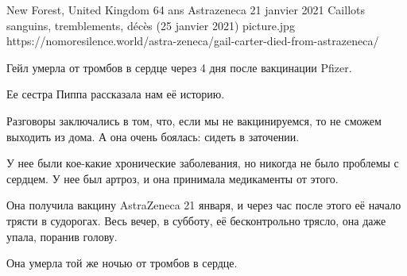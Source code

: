           {New Forest, United Kingdom}
          {64 ans}
          {Astrazeneca}
          {21 janvier 2021}
          {Caillots sanguins, tremblements, décès (25 janvier 2021)}
          {picture.jpg}
          {https://nomoresilence.world/astra-zeneca/gail-carter-died-from-astrazeneca/}
          {

Гейл умерла от тромбов в сердце через 4 дня после вакцинации Pfizer.

Ее сестра Пиппа рассказала нам её историю.

Разговоры заключались в том, что, если мы не вакцинируемся, то не сможем
выходить из дома. А она очень боялась: сидеть в заточении.

У нее были кое-какие хронические заболевания, но никогда не было проблемы с
сердцем. У нее был артроз, и она принимала медикаменты от этого.

Она получила вакцину AstraZeneca 21 января, и через час после этого её начало
трясти в судорогах. Весь вечер, в субботу, её бесконтрольно трясло, она даже
упала, поранив голову.

Она умерла той же ночью от тромбов в сердце.

}
